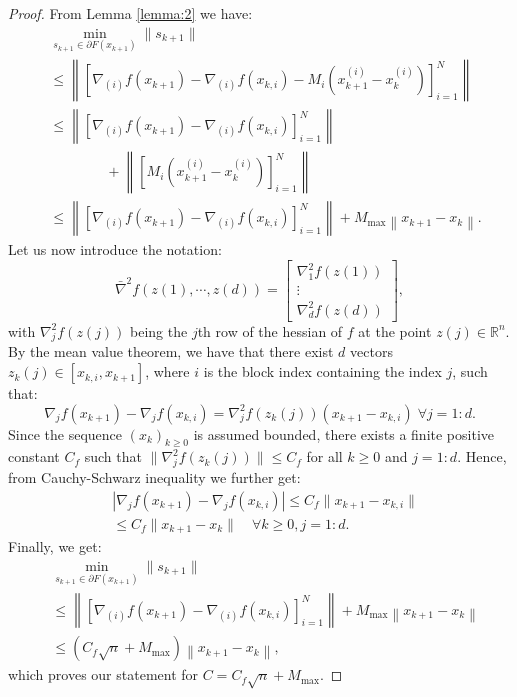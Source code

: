 \documentclass[lettersize,journal]{IEEEtran}
\begin{document}
\begin{proof}  
From Lemma 	\ref{lemma:2} we have:
\begin{align*}
& \min_{s_{k+1} \in \partial F(x_{k+1})} \|s_{k+1}\| \\
& \leq  \left \| \left[\nabla_{(i)} f(x_{k+1}) -\! \nabla_{(i)} f(x_{k,i}) -\! M_i \!\left(x_{k+1}^{(i)} \!- x_k^{(i)}\right)\!\right]_{i=1}^N \right \| \\ 
& \leq \left \| \left[\nabla_{(i)} f(x_{k+1}) -\! \nabla_{(i)} f(x_{k,i}) \right]_{i=1}^N \right \|  \\
& \qquad \qquad + \left \| \left[ \! M_i \!\left(x_{k+1}^{(i)} \!- x_k^{(i)}\right)\!\right]_{i=1}^N \right \| \\
& \leq \left \| \left[\nabla_{(i)} f(x_{k+1}) -\! \nabla_{(i)} f(x_{k,i}) \right]_{i=1}^N \right \|  \!+\!  M_{\max} \! \left \| x_{k+1} \!- x_k \right \|.  
\end{align*}
 Let us now introduce the notation:  
\begin{equation}
	\bar{\nabla}^2 f (z{(1)},\cdots,z{(d)}) = \begin{bmatrix}
		\nabla_{1}^2 f (z{(1)})  \\
		\vdots \\		
		\nabla_{d}^2 f (z{(d)})
	\end{bmatrix}, 
\end{equation}	
\noindent with $\nabla_{j}^2 f (z{(j)})$ being the $j$th row of the hessian of $f$ at the point $z{(j)} \in \mathbb{R}^{n}$. By the mean value theorem, we have that there exist $d$ vectors $z_k{(j)} \in [x_{k,i},x_{k+1}]$, where $i$ is the block index containing the index $j$, such that: 
	\begin{equation*}
		\nabla_{j} f (x_{k+1}) -	\nabla_{j} f(x_{k,i}) \!=\! \nabla_{j}^2 f (z_k{(j)}) (x_{k+1} \!- x_{k,i})   \; \forall  j\!=\!1\!:\!d.
	\end{equation*} 
Since the sequence $(x_k)_{k \geq 0}$ is assumed bounded, there exists a finite positive constant $C_f$ such that $\| \nabla_{j}^2 f (z_k{(j)}) \| \leq C_f$ for all $k \geq 0$ and $j=1:d$.  Hence, from Cauchy-Schwarz inequality we further get: 
\begin{align*}
  & | \nabla_{j} f (x_{k+1}) -	\nabla_{j} f(x_{k,i})  |  \leq C_f \| x_{k+1} \!- x_{k,i} \| \\
  & \leq C_f \|  x_{k+1} \!- x_{k} \|  \quad \forall k \geq 0, j=1:d.  
\end{align*} 
 Finally, we get:
\begin{align*}
& \min_{s_{k+1} \in \partial F(x_{k+1})} \|s_{k+1}\| \\
& \leq \left \| \left[\nabla_{(i)} f(x_{k+1}) -\! \nabla_{(i)} f(x_{k,i}) \right]_{i=1}^N \right \|  \!+\!  M_{\max} \! \left \| x_{k+1} \!- x_k \right \|\\
& \leq (C_f \sqrt{n} + M_{\max}) \left \| x_{k+1} \!- x_k \right \|, 
\end{align*} 
which proves our statement for $C = C_f \sqrt{n} + M_{\max}$.  
\end{proof}
\end{document}
